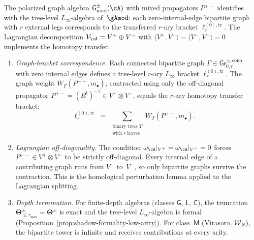 \begin{theorem}
\label{thm:bipartite-linfty-tree}
\ClaimStatusProvedHere
{}
The polarized graph algebra
$\mathsf{G}^{\pm}_{\mathrm{mod}}(\cA)$ with mixed propagators
$P^{+-}$ identifies with the tree-level $L_\infty$-algebra
of~$\gAmod$: each zero-internal-edge bipartite graph with $r$
external legs corresponds to the transferred $r$-ary bracket
$\ell_r^{(0),\mathrm{tr}}$.  The Lagrangian decomposition
$V_\cA = V^+ \oplus V^-$ with
$\langle V^+, V^+ \rangle = \langle V^-, V^- \rangle = 0$
implements the homotopy transfer.
\begin{enumerate}[label=\textup{(\roman*)}]
\item \emph{Graph-bracket correspondence.}
  Each connected bipartite graph
  $\Gamma \in \mathsf{Gr}^{\pm,\mathrm{conn}}_{0,r}$ with zero
  internal edges defines a tree-level $r$-ary $L_\infty$ bracket
  $\ell_r^{(0),\mathrm{tr}}$.  The graph weight
  $W_\Gamma(P^{+-}, m_\bullet)$, contracted using only the
  off-diagonal propagator
  $P^{+-} = (B^{\mathsf{t}})^{-1} \in V^+ \otimes V^-$, equals
  the $r$-ary homotopy transfer bracket:
  \[
    \ell_r^{(0),\mathrm{tr}}
    \;=\;
    \sum_{\substack{\text{binary trees }T\\
      \text{with }r\text{ leaves}}}
    W_T(P^{+-}, m_\bullet).
  \]
\item \emph{Lagrangian off-diagonality.}
  The condition
  $\omega_\cA|_{V^+} = \omega_\cA|_{V^-} = 0$ forces
  $P^{+-} \in V^+ \otimes V^-$ to be strictly off-diagonal.
  Every internal edge of a contributing graph runs from $V^+$
  to~$V^-$, so only bipartite graphs survive the
  contraction.  This is the homological perturbation lemma
  applied to the Lagrangian splitting.
\item \emph{Depth termination.}
  For finite-depth algebras (classes $\mathsf{G}$, $\mathsf{L}$,
  $\mathsf{C}$), the truncation
  $\boldsymbol\Theta^{\pm}_{\leq r_{\max}}
  = \boldsymbol\Theta^{\pm}$ is exact and the tree-level
  $L_\infty$-algebra is formal
  (Proposition~\textup{\ref{prop:shadow-formality-low-arity}}).
  For class~$\mathsf{M}$ (Virasoro, $\mathcal{W}_N$), the
  bipartite tower is infinite and receives contributions at
  every arity.
\end{enumerate}
\end{theorem}

